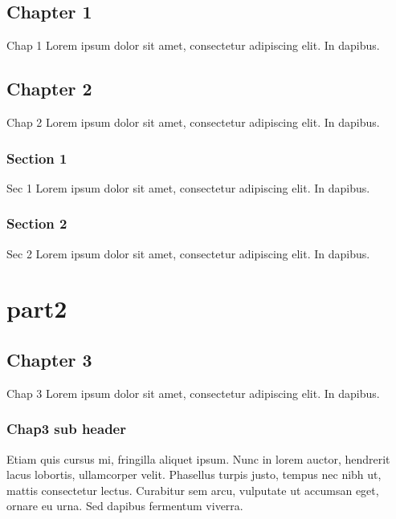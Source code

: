 \documentclass[letterpaper,10pt,english]{jupyterBook}
\begin{document}
\chapter{Chapter 1}
\label{\detokenize{part1/chap1:chapter-1}}\label{\detokenize{part1/chap1::doc}}
Chap 1 Lorem ipsum dolor sit amet, consectetur adipiscing elit. In dapibus.


\chapter{Chapter 2}
\label{\detokenize{part1/chap2:chapter-2}}\label{\detokenize{part1/chap2::doc}}
Chap 2 Lorem ipsum dolor sit amet, consectetur adipiscing elit. In dapibus.





\section{Section 1}
\label{\detokenize{part1/sec1:section-1}}\label{\detokenize{part1/sec1::doc}}
Sec 1 Lorem ipsum dolor sit amet, consectetur adipiscing elit. In dapibus.


\section{Section 2}
\label{\detokenize{part1/sec2:section-2}}\label{\detokenize{part1/sec2::doc}}
Sec 2 Lorem ipsum dolor sit amet, consectetur adipiscing elit. In dapibus.


\part{part2}


\chapter{Chapter 3}
\label{\detokenize{part2/chap3:chapter-3}}\label{\detokenize{part2/chap3::doc}}
Chap 3 Lorem ipsum dolor sit amet, consectetur adipiscing elit. In dapibus.


\section{Chap3 sub header}
\label{\detokenize{part2/chap3:chap3-sub-header}}
Etiam quis cursus mi, fringilla aliquet ipsum. Nunc in lorem auctor, hendrerit lacus lobortis, ullamcorper velit. Phasellus turpis justo, tempus nec nibh ut, mattis consectetur lectus. Curabitur sem arcu, vulputate ut accumsan eget, ornare eu urna. Sed dapibus fermentum viverra.
\end{document}
